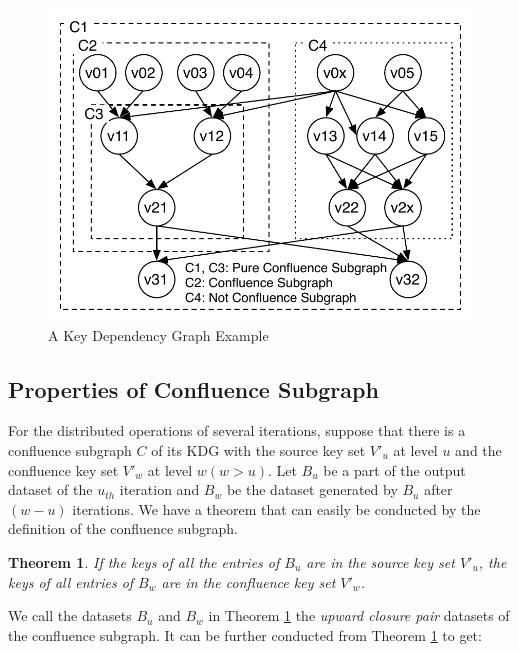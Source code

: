 \documentclass[10pt,journal,compsoc]{IEEEtran}
\begin{document}
\begin{figure}[!t]
\centering
\includegraphics[width=1\columnwidth]{figure3}
\caption{A Key Dependency Graph Example}
\label{fig:keyDependencyGraph}
\end{figure}

\subsection{Properties of Confluence Subgraph}
For the distributed operations of several iterations, suppose that there is a confluence subgraph $C$ of its KDG 
with the source key set $V'_u$ at level $u$ and the confluence key set $V'_w$ at level $w(w > u)$. 
Let $B_u$ be a part of the output dataset of the $u_{th}$ iteration 
and $B_w$ be the dataset generated by $B_u$ after $(w-u)$ iterations. 
We have a theorem that can easily be conducted by the definition of the confluence subgraph. 

\newtheorem{theorem}{\textbf{Theorem}}
\begin{theorem}\label{thm:upwardClosure}
If the keys of all the entries of $B_u$ are in the source key set $V'_u$, 
the keys of all entries of $B_w$ are in the confluence key set $V'_w$. 
\end{theorem}

We call the datasets $B_u$ and $B_w$ in Theorem \ref{thm:upwardClosure} 
the \emph{upward closure pair} datasets of the confluence subgraph. 
It can be further conducted from Theorem \ref{thm:upwardClosure} to get:
\end{document}
